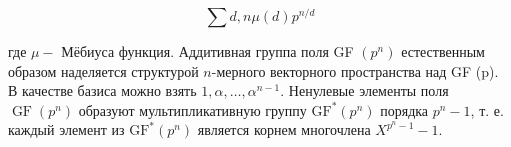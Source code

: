 \documentclass[10pt]{article}
\begin{document}
\[

\sum d, n \mu(d) p^{n / d}

\]



где $\mu-$ Мёбиуса функция. Аддитивная группа поля GF $\left(p^{n}\right)$ естественным образом наделяется структурой $n$-мерного векторного пространства над GF (p). В качестве базиса можно взять $1, \alpha, \ldots, \alpha^{n-1}$. Ненулевые элементы поля $\operatorname{GF}\left(p^{n}\right)$ образуют мультипликативную группу $\mathrm{GF}^{*}\left(p^{n}\right)$ порядка $p^{n}-1$, т. е. каждый элемент из $\mathrm{GF}^{*}\left(p^{n}\right)$ является корнем многочлена $X^{p^{n}-1}-1$.
\end{document}
